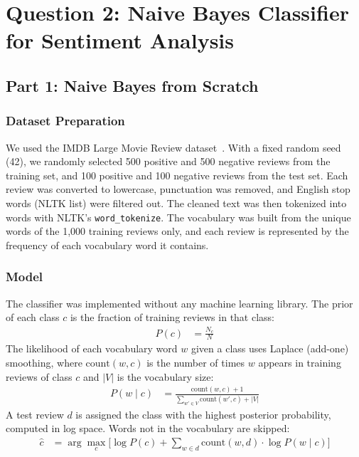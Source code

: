 \documentclass[sigconf]{acmart}
\begin{document}
\section{Question 2: Naive Bayes Classifier for Sentiment Analysis}

\subsection{Part 1: Naive Bayes from Scratch}

\subsubsection{Dataset Preparation}
We used the IMDB Large Movie Review dataset~\cite{maas2011}. With a fixed random seed (42), we randomly selected 500 positive and 500 negative reviews from the training set, and 100 positive and 100 negative reviews from the test set. Each review was converted to lowercase, punctuation was removed, and English stop words (NLTK list) were filtered out. The cleaned text was then tokenized into words with NLTK's \texttt{word\_tokenize}. The vocabulary was built from the unique words of the 1,000 training reviews only, and each review is represented by the frequency of each vocabulary word it contains.

\subsubsection{Model}
The classifier was implemented without any machine learning library. The prior of each class $c$ is the fraction of training reviews in that class:
\begin{align}
P(c) &= \frac{N_c}{N}
\end{align}
The likelihood of each vocabulary word $w$ given a class uses Laplace (add-one) smoothing, where $\text{count}(w, c)$ is the number of times $w$ appears in training reviews of class $c$ and $|V|$ is the vocabulary size:
\begin{align}
P(w \mid c) &= \frac{\text{count}(w, c) + 1}{\sum_{w' \in V} \text{count}(w', c) + |V|}
\end{align}
A test review $d$ is assigned the class with the highest posterior probability, computed in log space. Words not in the vocabulary are skipped:
\begin{align}
\hat{c} &= \arg\max_{c} \Big[ \log P(c) + \sum_{w \in d} \text{count}(w, d) \cdot \log P(w \mid c) \Big]
\end{align}
\end{document}
